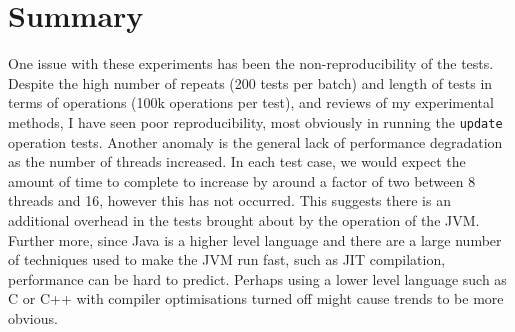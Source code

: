\documentclass[11pt]{article}
\begin{document}
\section{Summary}

One issue with these experiments has been the non-reproducibility of the tests. Despite the high number of repeats (200 tests per batch) and length of tests in terms of operations (100k operations per test), and reviews of my experimental methods, I have seen poor reproducibility, most obviously in running the \texttt{update} operation tests. Another anomaly is the general lack of performance degradation as the number of threads increased. In each test case, we would expect the amount of time to complete to increase by around a factor of two between 8 threads and 16, however this has not occurred. This suggests there is an additional overhead in the tests brought about by the operation of the JVM. Further more, since Java is a higher level language and there are a large number of techniques used to make the JVM run fast, such as JIT compilation, performance can be hard to predict. Perhaps using a lower level language such as C or C++ with compiler optimisations turned off might cause trends to be more obvious.
\end{document}
